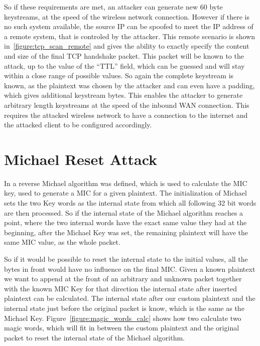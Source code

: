 \documentclass[a4paper,10pt]{scrartcl}
\begin{document}
So if these requirements are met, an attacker can generate new 60 byte keystreams, at the speed of the wireless network connection.
However if there is no such system available, the source IP can be spoofed to meet the IP address of a remote system, that is controled
by the attacker. This remote scenario is shown in~\ref{figure:tcp_scan_remote} and gives the ability to exactly specify the content and
size of the final TCP handshake packet. This packet will be known to the attack, up to the value of the ``TTL'' field, which can be
guessed and will stay within a close range of possible values. So again the complete keystream is known, as the plaintext was chosen by
the attacker and can even have a padding, which gives additional keystream bytes. This enables the attacker to generate arbitrary length
keystreams at the speed of the inbound WAN connection. This requires the attacked wireless network to have a connection to the internet
and the attacked client to be configured accordingly.

\section{Michael Reset Attack}
\label{sec:reset_attack}

In \citep{BT08} a reverse Michael algorithm was defined, which is used to calculate the MIC key, used to generate a MIC for a given
plaintext. The initialization of Michael sets the two Key words as the internal state from which all following 32 bit words are then
processed. So if the internal state of the Michael algorithm reaches a point, where the two internal words have the exact same value
they had at the beginning, after the Michael Key was set, the remaining plaintext will have the same MIC value, as the whole packet.

So if it would be possible to reset the internal state to the initial values, all the bytes in front would have no influence on the
final MIC\@. Given a known plaintext we want to append at the front of an arbitrary and unknown packet together with the known MIC Key
for that direction the internal state after inserted plaintext can be calculated. The internal state after our custom plaintext and
the internal state just before the original packet is know, which is the same as the Michael Key. Figure~\ref{figure:magic_words_calc}
shows how two calculate two magic words, which will fit in between the custom plaintext and the original packet to reset the internal
state of the Michael algorithm.
\end{document}
